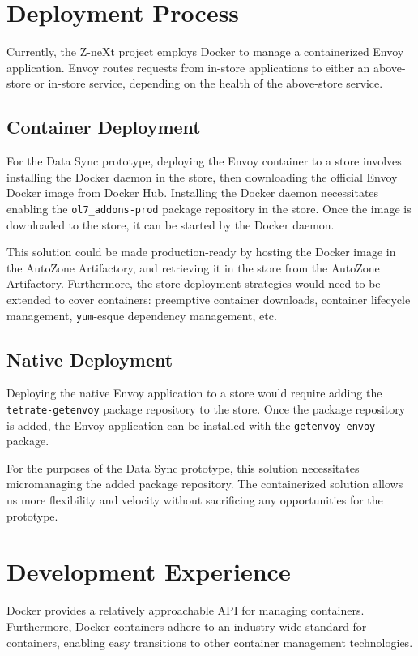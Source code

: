 \documentclass{article}
\begin{document}
\section{Deployment Process}
Currently, the Z-neXt project employs Docker to manage a containerized Envoy application. Envoy routes requests from in-store applications to either an above-store or in-store service, depending on the health of the above-store service.

\subsection{Container Deployment}
For the Data Sync prototype, deploying the Envoy container to a store involves installing the Docker daemon in the store, then downloading the official Envoy Docker image from Docker Hub. Installing the Docker daemon necessitates enabling the \texttt{ol7\_addons-prod} package repository in the store. Once the image is downloaded to the store, it can be started by the Docker daemon.

This solution could be made production-ready by hosting the Docker image in the AutoZone Artifactory, and retrieving it in the store from the AutoZone Artifactory. Furthermore, the store deployment strategies would need to be extended to cover containers: preemptive container downloads, container lifecycle management, \texttt{yum}-esque dependency management, etc.

\subsection{Native Deployment}
Deploying the native Envoy application to a store would require adding the \texttt{tetrate-getenvoy} package repository to the store. Once the package repository is added, the Envoy application can be installed with the \texttt{getenvoy-envoy} package.

For the purposes of the Data Sync prototype, this solution necessitates micromanaging the added package repository. The containerized solution allows us more flexibility and velocity without sacrificing any opportunities for the prototype.

\section{Development Experience}
Docker provides a relatively approachable API for managing containers. Furthermore, Docker containers adhere to an industry-wide standard for containers, enabling easy transitions to other container management technologies.
\end{document}
